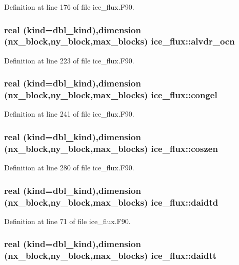 Definition at line 176 of file ice\_\-flux.F90.\hypertarget{namespaceice__flux_a0d5c384f44be34217703bef2e23ebdc6}{
\subsubsection[{alvdr\_\-ocn}]{\setlength{\rightskip}{0pt plus 5cm}real (kind=dbl\_\-kind),dimension (nx\_\-block,ny\_\-block,max\_\-blocks) {\bf ice\_\-flux::alvdr\_\-ocn}}}
\label{namespaceice__flux_a0d5c384f44be34217703bef2e23ebdc6}


Definition at line 223 of file ice\_\-flux.F90.\hypertarget{namespaceice__flux_acb44c9e01061e258c35b8dbadf412741}{
\subsubsection[{congel}]{\setlength{\rightskip}{0pt plus 5cm}real (kind=dbl\_\-kind),dimension (nx\_\-block,ny\_\-block,max\_\-blocks) {\bf ice\_\-flux::congel}}}
\label{namespaceice__flux_acb44c9e01061e258c35b8dbadf412741}


Definition at line 241 of file ice\_\-flux.F90.\hypertarget{namespaceice__flux_af909ebcaf2c2e92389a7dfce1e42f5c7}{
\subsubsection[{coszen}]{\setlength{\rightskip}{0pt plus 5cm}real (kind=dbl\_\-kind),dimension (nx\_\-block,ny\_\-block,max\_\-blocks) {\bf ice\_\-flux::coszen}}}
\label{namespaceice__flux_af909ebcaf2c2e92389a7dfce1e42f5c7}


Definition at line 280 of file ice\_\-flux.F90.\hypertarget{namespaceice__flux_a24c9cd15dee4efbf6d35e4bafb03a6e0}{
\subsubsection[{daidtd}]{\setlength{\rightskip}{0pt plus 5cm}real (kind=dbl\_\-kind),dimension (nx\_\-block,ny\_\-block,max\_\-blocks) {\bf ice\_\-flux::daidtd}}}
\label{namespaceice__flux_a24c9cd15dee4efbf6d35e4bafb03a6e0}


Definition at line 71 of file ice\_\-flux.F90.\hypertarget{namespaceice__flux_aff988ec903f1e7908e7b8a176ea792ed}{
\subsubsection[{daidtt}]{\setlength{\rightskip}{0pt plus 5cm}real (kind=dbl\_\-kind),dimension (nx\_\-block,ny\_\-block,max\_\-blocks) {\bf ice\_\-flux::daidtt}}}
\label{namespaceice__flux_aff988ec903f1e7908e7b8a176ea792ed}


